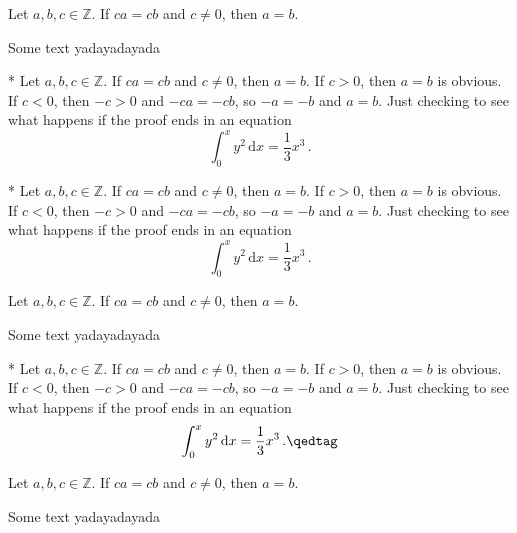 \begin{nicelemma} \label{lem:seemstowork}
    Let $a,b,c\in\mathbb{Z}$. If $ca = cb$ and $c\neq 0$, then $a = b$. \manualqed
\end{nicelemma}

Some text yadayadayada

\begin{nicetheorem}* \label{theo:whatever}
    Let $a,b,c\in\mathbb{Z}$. If $ca = cb$ and $c\neq 0$, then $a = b$.
    \nextpart
    If $c > 0$, then $a = b$ is obvious. If $c < 0$, then $-c > 0$ and $-ca = -cb$, so $-a = -b$ and $a = b$.
    Just checking to see what happens if the proof ends in an equation
    \[
        \int_0^x y^2 \,\mathrm{d}x = \frac{1}{3} x^3 \,. 
    \]
\end{nicetheorem}

\begin{nicetheorem*}* \label{theo:whatever2}
    Let $a,b,c\in\mathbb{Z}$. If $ca = cb$ and $c\neq 0$, then $a = b$.
    \nextpart
    If $c > 0$, then $a = b$ is obvious. If $c < 0$, then $-c > 0$ and $-ca = -cb$, so $-a = -b$ and $a = b$.
    Just checking to see what happens if the proof ends in an equation
    \[
        \int_0^x y^2 \,\mathrm{d}x = \frac{1}{3} x^3 \,. 
    \]
\end{nicetheorem*}

\begin{nicetheorem} \label{theo:seemstowork}
    Let $a,b,c\in\mathbb{Z}$. If $ca = cb$ and $c\neq 0$, then $a = b$.
\end{nicetheorem}

Some text yadayadayada

\begin{nicecorollary}* \label{cor:whatever}
    Let $a,b,c\in\mathbb{Z}$. If $ca = cb$ and $c\neq 0$, then $a = b$.
    \nextpart
    If $c > 0$, then $a = b$ is obvious. If $c < 0$, then $-c > 0$ and $-ca = -cb$, so $-a = -b$ and $a = b$.
    Just checking to see what happens if the proof ends in an equation
    \begin{equation}
        \int_0^x y^2 \,\mathrm{d}x = \frac{1}{3} x^3 \,. \qedtag
    \end{equation}
\end{nicecorollary}

\begin{nicecorollary} \label{cor:seemstowork}
    Let $a,b,c\in\mathbb{Z}$. If $ca = cb$ and $c\neq 0$, then $a = b$.
\end{nicecorollary}

Some text yadayadayada

